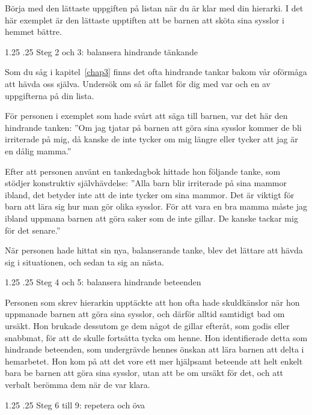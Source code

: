\documentclass[swedish,a4paper]{book}
\makeatletter
\renewcommand\section{\@startsection{section}{1}{\z@}%
                                   {1.25\baselineskip}%
                                   {.25\baselineskip}%
                                   {\fontsize{1.25\baselineskip}{1.25\baselineskip}\selectfont\sffamily\bfseries}} %
\makeatother
\begin{document}
Börja med den lättaste uppgiften på listan när du är klar med din hierarki. I det här exemplet är den lättaste upptiften att be barnen att sköta sina sysslor i hemmet bättre.

\section{Steg 2 och 3: balansera hindrande tänkande}

Som du såg i kapitel~\ref{chap3} finns det ofta hindrande tankar bakom vår oförmåga att hävda oss själva. Undersök om så är fallet för dig med var och en av uppgifterna på din lista.

För personen i exemplet som hade svårt att säga till barnen, var det här den hindrande tanken: ''Om jag tjatar på barnen att göra sina sysslor kommer de bli irriterade på mig, då kanske de inte tycker om mig längre eller tycker att jag är en dålig mamma.''

Efter att personen använt en tankedagbok hittade hon följande tanke, som stödjer konstruktiv självhävdelse: ''Alla barn blir irriterade på sina mammor ibland, det betyder inte att de inte tycker om sina mammor. Det är viktigt för barn att lära sig hur man gör olika sysslor. För att vara en bra mamma måste jag ibland uppmana barnen att göra saker som de inte gillar. De kanske tackar mig för det senare.''

När personen hade hittat sin nya, balanserande tanke, blev det lättare att hävda sig i situationen, och sedan ta sig an nästa.

\section{Steg 4 och 5: balansera hindrande beteenden}

Personen som skrev hierarkin upptäckte att hon ofta hade skuldkänslor när hon uppmanade barnen att göra sina sysslor, och därför alltid samtidigt bad om ursäkt. Hon brukade dessutom ge dem något de gillar efteråt, som godis eller snabbmat, för att de skulle fortsätta tycka om henne. Hon identifierade detta som hindrande beteenden, som undergrävde hennes önskan att lära barnen att delta i hemarbetet. Hon kom på att det vore ett mer hjälpsamt beteende att helt enkelt bara be barnen att göra sina sysslor, utan att be om ursäkt för det, och att verbalt berömma dem när de var klara.

\section{Steg 6 till 9: repetera och öva}
\end{document}
